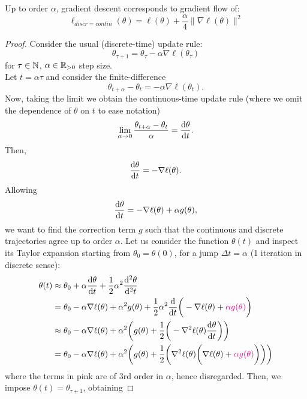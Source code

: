 \documentclass[reqno]{amsart}
\begin{document}
\begin{proposition}
Up to order $\alpha$, gradient descent corresponds to gradient flow of:
\begin{equation*}
\ell_{discr=contin}(\theta) =\ell(\theta)+\frac{\alpha}{4}\big\lVert\nabla\ell(\theta)\big\rVert^2
\end{equation*}
\begin{proof}
    Consider the usual (discrete-time) update rule:
    \begin{equation*}
        \theta_{\tau+1} = \theta_\tau -\alpha\nabla\ell(\theta_\tau)
    \end{equation*}
for $\tau \in \mathbb{N}$, $\alpha\in\mathbb{R}_{>0}$ step size.
\\
Let $t=\alpha\tau$ and consider the finite-difference
\[
\theta_{t+\alpha} - \theta_t = -\alpha\nabla\ell(\theta_t).
\]
Now, taking the limit we obtain the continuous-time update rule (where we omit the dependence of $\theta$ on $t$ to ease notation)
\begin{align*}
\lim_{\alpha\to0} \frac{\theta_{t+\alpha} - \theta_t}{\alpha} = \frac{\mathop{}\!\mathrm{d} \theta}{\mathop{}\!\mathrm{d} t}.
\end{align*}
Then,
\begin{equation}
    \frac{\mathop{}\!\mathrm{d} \theta}{\mathop{}\!\mathrm{d} t}= -\nabla\ell(\theta).
\end{equation}
Allowing
\[
\frac{\mathop{}\!\mathrm{d} \theta}{\mathop{}\!\mathrm{d} t}= -\nabla\ell(\theta) + \alpha g(\theta),
\]
we want to find the correction term $g$ such that the continuous and discrete trajectories agree up to order $\alpha$.
Let us consider the function $\theta(t)$ and inspect its Taylor expansion starting from $\theta_0=\theta(0)$, for a jump $\Delta t=\alpha$ (1 iteration in discrete sense):
\begin{align*}
\theta(t) &\approx \theta_0 + \alpha \frac{\de \theta}{\de t}  + \frac{1}{2}\alpha^2 \frac{\de^2 \theta}{\de^2 t} \\
&= \theta_0 - \alpha \nabla\ell(\theta) + \alpha^2 g(\theta) + \frac{1}{2}\alpha^2 \frac{\de}{\de t} \bigg(-\nabla\ell(\theta) +{\color{magenta}\alpha g(\theta)}\bigg)\\
&\approx \theta_0 - \alpha \nabla\ell(\theta) + \alpha^2 \bigg(g(\theta) + \frac{1}{2}\bigg(-\nabla^2\ell(\theta)\frac{\de\theta}{\de t}\bigg)\bigg)\\
& = \theta_0 - \alpha \nabla\ell(\theta) + \alpha^2 \bigg(g(\theta) + \frac{1}{2}\bigg(\nabla^2\ell(\theta)\bigg(\nabla\ell(\theta) + {\color{magenta} \alpha g(\theta)}\bigg)\bigg)\bigg)
\end{align*}
where the terms in pink are of 3rd order in $\alpha$, hence disregarded.
Then, we impose $\theta(t) = \theta_{\tau+1}$, obtaining

\end{proof}
\end{proposition}
\end{document}
